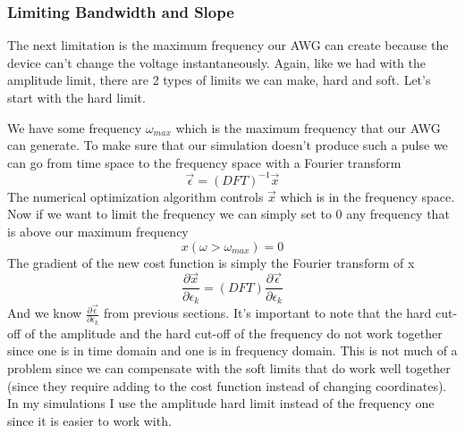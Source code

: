 

\subsubsection{Limiting Bandwidth and Slope}
The next limitation is the maximum frequency our AWG can create because the device can't change the voltage instantaneously. Again, like we had with the amplitude limit, there are 2 types of limits we can make, hard and soft. Let's start with the hard limit.

We have some frequency $ \omega_{max} $ which is the maximum frequency that our AWG can generate. To make sure that our simulation doesn't produce such a pulse we can go from time space to the frequency space with a Fourier transform
\[
    \vec{\epsilon} = (DFT)^{-1} \vec{x}
\]
The numerical optimization algorithm controls $\vec{x}$ which is in the frequency space. Now if we want to limit the frequency we can simply set to 0 any frequency that is above our maximum frequency
\[
    x (\omega > \omega_{max}) = 0
\]
The gradient of the new cost function is simply the Fourier transform of x
\[
    \frac{\partial \vec{x}}{\partial \epsilon_k} = (DFT) \frac{\partial \vec{\epsilon}}{\partial \epsilon_k}
\]
And we know $\frac{\partial \vec{\epsilon}}{\partial \epsilon_k}$ from previous sections.
It's important to note that the hard cut-off of the amplitude and the hard cut-off of the frequency do not work together since one is in time domain and one is in frequency domain. This is not much of a problem since we can compensate with the soft limits that do work well together (since they require adding to the cost function instead of changing coordinates). In my simulations I use the amplitude hard limit instead of the frequency one since it is easier to work with.

